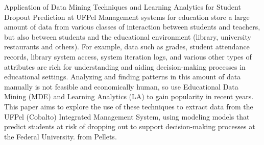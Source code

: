 \documentclass[diss,capa]{texufpel}
\begin{document}
\begin{abstract}
Os sistemas de gestão para educação armazenam uma grande quantidade de dados oriundos de diversas modalidades de iteração entre alunos e professores mas também entre os alunos e o ambiente educacional (biblioteca, restaurantes universitários entre outros). Por exemplo, dados como notas, registro de presença de aluno, acesso ao sistema de biblioteca, logs de iteração com o sistema e vários outros tipos de atributos são ricos para a compreensão e auxílio nos processos de tomada de decisão em ambientes educacionais. Analisar e encontrar padrões nesta quantidade de dados manualmente é inviável humana e economicamente, por isso a utilização de Mineração de Dados Educacionais (MDE) e \textit{Learning Analytics (LA)} ganharam popularidade nos últimos anos. Este trabalho pretende explorar a utilização destas técnicas para extrair os dados do Sistema Integrado de Gestão da UFPel (Cobalto) visando criar modelos que levem a predição de alunos em risco de evasão para suporte aos processos de tomada de decisão na Universidade Federal de Pelotas.
\end{abstract}

\begin{englishabstract}{Application of Data Mining Techniques and Learning Analytics for Student Dropout Prediction at UFPel}
Management systems for education store a large amount of data from various classes of interaction between students and teachers, but also between students and the educational environment (library, university restaurants and others). For example, data such as grades, student attendance records, library system access, system iteration logs, and various other types of attributes are rich for understanding and aiding decision-making processes in educational settings. Analyzing and finding patterns in this amount of data manually is not feasible and economically human, so use Educational Data Mining (MDE) and Learning Analytics (LA) to gain popularity in recent years. This paper aims to explore the use of these techniques to extract data from the UFPel (Cobalto) Integrated Management System, using modeling models that predict students at risk of dropping out to support decision-making processes at the Federal University. from Pellets.
\end{englishabstract}

\listoffigures

\listoftables
\end{document}
